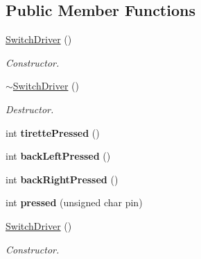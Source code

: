 \subsection*{Public Member Functions}
\begin{DoxyCompactItemize}
\item 
\mbox{\label{classSwitchDriver_a318f2cc1988d9ddfae71131fcf39d929}} 
\hyperlink{classSwitchDriver_a318f2cc1988d9ddfae71131fcf39d929}{Switch\+Driver} ()
\begin{DoxyCompactList}\small\item\em Constructor. \end{DoxyCompactList}\item 
\mbox{\label{classSwitchDriver_a8a8cb8dff5ed4c61b9da36389c21dcf8}} 
\hyperlink{classSwitchDriver_a8a8cb8dff5ed4c61b9da36389c21dcf8}{$\sim$\+Switch\+Driver} ()
\begin{DoxyCompactList}\small\item\em Destructor. \end{DoxyCompactList}\item 
\mbox{\label{classSwitchDriver_a1b2f0e72af9da5be2432978f13bf52ca}} 
int {\bfseries tirette\+Pressed} ()
\item 
\mbox{\label{classSwitchDriver_a97cf6ca8501fbd0ca937c366b32ee191}} 
int {\bfseries back\+Left\+Pressed} ()
\item 
\mbox{\label{classSwitchDriver_af20343abbad7e959ce0fadb3c8bdb145}} 
int {\bfseries back\+Right\+Pressed} ()
\item 
\mbox{\label{classSwitchDriver_a379d72f1adda71986eda15ac793e47b2}} 
int {\bfseries pressed} (unsigned char pin)
\item 
\mbox{\label{classSwitchDriver_a318f2cc1988d9ddfae71131fcf39d929}} 
\hyperlink{classSwitchDriver_a318f2cc1988d9ddfae71131fcf39d929}{Switch\+Driver} ()
\begin{DoxyCompactList}\small\item\em Constructor. \end{DoxyCompactList}\item 
\mbox{\label{classSwitchDriver_a8a8cb8dff5ed4c61b9da36389c21dcf8}} 

\end{DoxyCompactItemize}

